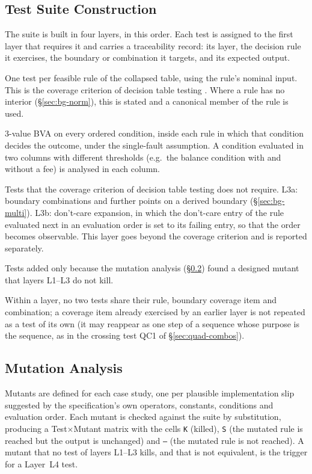 \documentclass[11pt,a4paper]{article}
\begin{document}
\subsection{Test Suite Construction}
\label{sec:meth-suite}
The suite is built in four layers, in this order. Each test is assigned to
the first layer that requires it and carries a traceability record: its
layer, the decision rule it exercises, the boundary or combination it
targets, and its expected output.
\begin{description}[style=nextline,leftmargin=1.2em]
    \item[L1 -- Decision table coverage.] One test per feasible rule of the
    collapsed table, using the rule's nominal input. This is the coverage
    criterion of decision table testing \cite[\S4.2.3]{istqb}. Where a rule
    has no interior (\S\ref{sec:bg-norm}), this is stated and a canonical
    member of the rule is used.
    \item[L2 -- Boundary values of the conditions.] 3-value BVA on every
    ordered condition, inside each rule in which that condition decides the
    outcome, under the single-fault assumption. A condition evaluated in
    two columns with different thresholds (e.g.\ the balance condition with
    and without a fee) is analysed in each column.
    \item[L3 -- Extension: combinations and don't-care expansion.] Tests that
    the coverage criterion of decision table testing does not require.
    L3a: boundary combinations and further points on a derived boundary
    (\S\ref{sec:bg-multi}). L3b: don't-care expansion, in which the
    don't-care entry of the rule evaluated next in an evaluation order is
    set to its failing entry, so that the order becomes observable. This
    layer goes beyond the coverage criterion and is reported separately.
    \item[L4 -- Mutation feedback.] Tests added only because the mutation
    analysis (\S\ref{sec:meth-mut}) found a designed mutant that layers
    L1--L3 do not kill.
\end{description}
Within a layer, no two tests share their rule, boundary coverage item and
combination; a coverage item already exercised by an earlier layer is not
repeated as a test of its own (it may reappear as one step of a sequence
whose purpose is the sequence, as in the crossing test QC1 of
\S\ref{sec:quad-combos}).

\subsection{Mutation Analysis}
\label{sec:meth-mut}
Mutants are defined for each case study, one per plausible implementation
slip suggested by the specification's own operators, constants, conditions
and evaluation order. Each mutant is checked against the suite by
substitution, producing a Test\(\times\)Mutant matrix with the cells
\texttt{K} (killed), \texttt{S} (the mutated rule is reached but the output
is unchanged) and \texttt{--} (the mutated rule is not reached). A mutant
that no test of layers L1--L3 kills, and that is not equivalent, is the
trigger for a Layer~L4 test.
\end{document}
